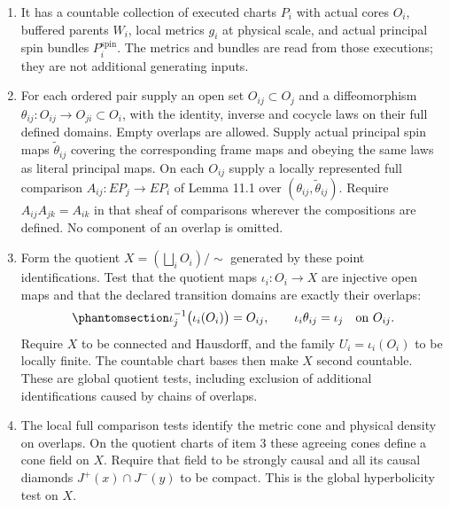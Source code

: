 \documentclass[
  english,
  11pt,
  reqno]{amsart}
\begin{document}
\begin{enumerate}
\item
  It has a countable collection of executed charts \(P_i\) with actual
  cores \(O_i\), buffered parents \(W_i\), local metrics \(g_i\) at
  physical scale, and actual principal spin bundles
  \(P_i^{\mathrm{spin}}\). The metrics and bundles are read from those
  executions; they are not additional generating inputs.
\item
  For each ordered pair supply an open set \(O_{ij}\subset O_j\) and a
  diffeomorphism \(\theta_{ij}:O_{ij}\to O_{ji}\subset O_i\), with the
  identity, inverse and cocycle laws on their full defined domains.
  Empty overlaps are allowed. Supply actual principal spin maps
  \(\widetilde\theta_{ij}\) covering the corresponding frame maps and
  obeying the same laws as literal principal maps. On each \(O_{ij}\)
  supply a locally represented full comparison \(A_{ij}:E P_j\to E P_i\)
  of Lemma 11.1 over \((\theta_{ij},\widetilde\theta_{ij})\). Require
  \(A_{ij}A_{jk}=A_{ik}\) in that sheaf of comparisons wherever the
  compositions are defined. No component of an overlap is omitted.
\item
  Form the quotient \(X=(\bigsqcup_i O_i)/\!\sim\) generated by these
  point identifications. Test that the quotient maps
  \(\iota_i:O_i\to X\) are injective open maps and that the declared
  transition domains are exactly their overlaps:
  \begin{equation}\protect\phantomsection\label{eq:ordinary-atlas-effective-chart-tests}{
  \iota_j^{-1}\bigl(\iota_i(O_i)\bigr)=O_{ij},
  \qquad
  \iota_i\theta_{ij}=\iota_j\quad\text{on }O_{ij}.
  }\end{equation} Require \(X\) to be connected and Hausdorff, and the
  family \(U_i=\iota_i(O_i)\) to be locally finite. The countable chart
  bases then make \(X\) second countable. These are global quotient
  tests, including exclusion of additional identifications caused by
  chains of overlaps.
\item
  The local full comparison tests identify the metric cone and physical
  density on overlaps. On the quotient charts of item 3 these agreeing
  cones define a cone field on \(X\). Require that field to be strongly
  causal and all its causal diamonds \(J^+(x)\cap J^-(y)\) to be
  compact. This is the global hyperbolicity test on \(X\).
\end{enumerate}
\end{document}
